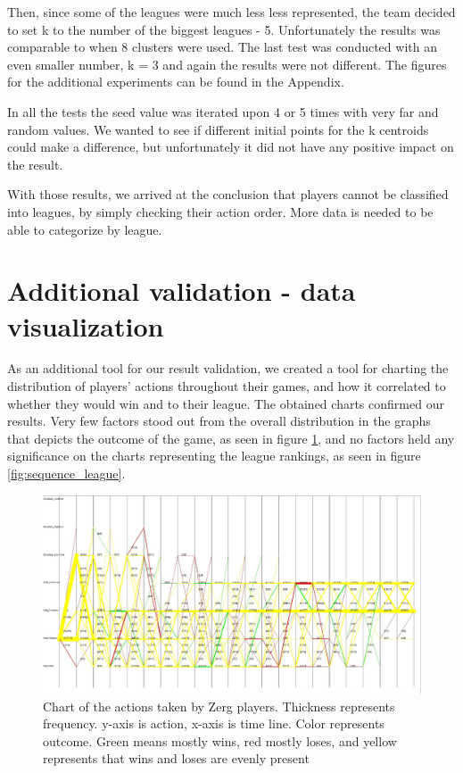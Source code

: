 \documentclass[a4paper,11pt]{article}
\begin{document}
Then, since some of the leagues were much less less represented, the team decided to set k to the number of the biggest leagues - 5. Unfortunately the results was comparable to when 8 clusters were used.
The last test was conducted with an even smaller number, k = 3 and again the results were not different. The figures for the additional experiments can be found in the Appendix.

In all the tests the seed value was iterated upon 4 or 5 times with very far and random values. We wanted to see if different initial points for the k centroids could make a difference, but unfortunately it did not have any positive impact on the result.

With those results, we arrived at the conclusion that players cannot be classified into leagues, by simply checking their action order. More data is needed to be able to categorize by league.

\section{Additional validation - data visualization}
As an additional tool for our result validation, we created a tool for charting the distribution of players' actions throughout their games, and how it correlated to whether they would win and to their league.
The obtained charts confirmed our results. Very few factors stood out from the overall distribution in the graphs that depicts the outcome of the game, as seen in figure \ref{fig:sequence_win_zerg}, and no factors held any significance on the charts representing the league rankings, as seen in figure \ref{fig:sequence_league}. 
\begin{figure}[H]
\centering
  \includegraphics[width=.9\linewidth]{sequence_win_zerg}
\caption{Chart of the actions taken by Zerg players. Thickness represents frequency. y-axis is action, x-axis is time line. Color represents outcome. Green means mostly wins, red mostly loses, and yellow represents that wins and loses are evenly present}
\label{fig:sequence_win_zerg}
\end{figure}
\end{document}
